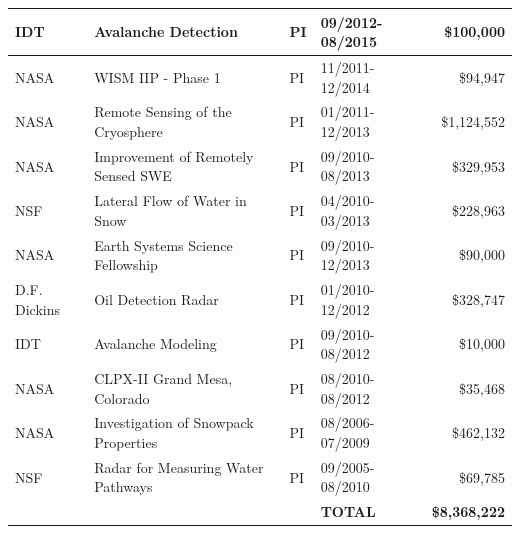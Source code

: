 \documentclass[11pt]{article}
\begin{document}
\begin{table}[!htbp]
\begin{tabular}{|l|l|l|l|r|}
IDT & Avalanche Detection & PI & 09/2012-08/2015 & \$100,000 \\ \hline
NASA & WISM IIP - Phase 1 & PI & 11/2011-12/2014 & \$94,947 \\ \hline
NASA & Remote Sensing of the Cryosphere & PI & 01/2011-12/2013 & \$1,124,552 \\ \hline
NASA & Improvement of Remotely Sensed SWE & PI & 09/2010-08/2013 & \$329,953 \\ \hline
NSF & Lateral Flow of Water in Snow & PI & 04/2010-03/2013 & \$228,963 \\ \hline
NASA & Earth Systems Science Fellowship & PI & 09/2010-12/2013 & \$90,000 \\ \hline
D.F. Dickins & Oil Detection Radar & PI & 01/2010-12/2012 & \$328,747 \\ \hline
IDT & Avalanche Modeling & PI & 09/2010-08/2012 & \$10,000 \\ \hline
NASA & CLPX-II Grand Mesa, Colorado & PI & 08/2010-08/2012 & \$35,468 \\ \hline
NASA & Investigation of Snowpack Properties & PI & 08/2006-07/2009 & \$462,132 \\ \hline
NSF & Radar for Measuring Water Pathways & PI & 09/2005-08/2010 & \$69,785 \\ \hline
& &  & \textbf{TOTAL} & \textbf{\$8,368,222} \\ \hline
\end{tabular} %
\end{table}

\pagebreak
\end{document}
